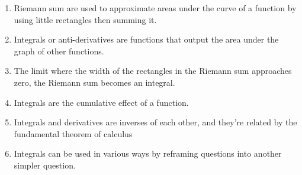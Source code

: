 \conclusion

\begin{enumerate}
  \item Riemann sum are used to approximate areas under the curve of a function by using little rectangles then summing it.
  \item Integrals or anti-derivatives are functions that output the area under the graph of other functions.
  \item The limit where the width of the rectangles in the Riemann sum approaches zero, the Riemann sum becomes an integral.
  \item Integrals are the cumulative effect of a function.
  \item Integrals and derivatives are inverses of each other, and they're related by the fundamental theorem of calculus
  \item Integrals can be used in various ways by reframing questions into another simpler question.
\end{enumerate}
